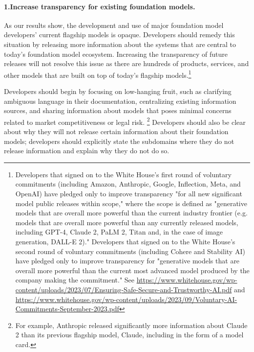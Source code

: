 \paragraph{1.\phantom{X}Increase transparency for existing foundation models.} 
    \begin{myitemize}
        \item As our results show, the development and use of major foundation model developers' current flagship models is opaque. 
        Developers should remedy this situation by releasing more information about the systems that are central to today's foundation model ecosystem. 
        Increasing the transparency of future releases will not resolve this issue as there are hundreds of products, services, and other models that are built on top of today's flagship models.\footnote{Developers that signed on to the White House's first round of voluntary commitments (including Amazon, Anthropic, Google, Inflection, Meta, and OpenAI)  have pledged only to improve transparency "for all new significant model public releases within scope," where the scope is defined as "generative models that are overall more powerful than the current industry frontier (e.g. models that are overall more powerful than any currently released models, including GPT-4, Claude 2, PaLM 2, Titan and, in the case of image generation, DALL-E 2)." Developers that signed on to the White House's second round of voluntary commitments (including Cohere and Stability AI) have pledged only to improve transparency for "generative models that are overall more powerful than the current most advanced model produced by the company making the commitment." See \url{https://www.whitehouse.gov/wp-content/uploads/2023/07/Ensuring-Safe-Secure-and-Trustworthy-AI.pdf} and \url{https://www.whitehouse.gov/wp-content/uploads/2023/09/Voluntary-AI-Commitments-September-2023.pdf}}
        \item Developers should begin by focusing on low-hanging fruit, such as clarifying ambiguous language in their documentation, centralizing existing information sources, and sharing information about models that poses minimal concerns related to market competitiveness or legal risk.
        \footnote{For example, Anthropic released significantly more information about Claude 2 than its previous flagship model, Claude, including in the form of a model card.} 
        Developers should also be clear about why they will not release certain information about their foundation models; developers should explicitly state the subdomains where they do not release information and explain why they do not do so. 
    \end{myitemize}
